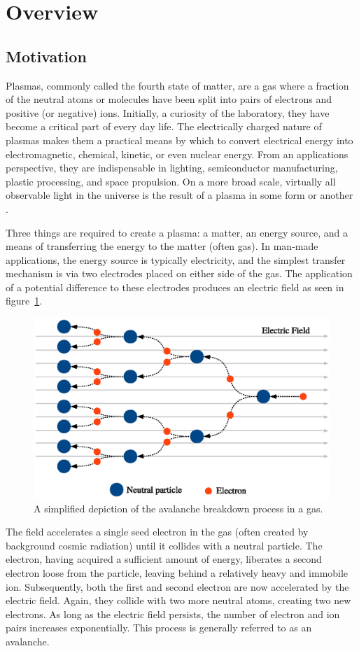 \section{Overview}

\subsection{Motivation}
Plasmas, commonly called the fourth state of matter, are a gas where a fraction
of the neutral atoms or molecules have been split into pairs of electrons and
positive (or negative) ions. Initially, a curiosity of the laboratory, they have
become a critical part of every day life. The electrically charged nature of
plasmas makes them a practical means by which to convert electrical energy into
electromagnetic, chemical, kinetic, or even nuclear energy. From an applications
perspective, they are indispensable in lighting, semiconductor manufacturing,
plastic processing, and space propulsion. On a more broad scale, virtually all
observable light in the universe is the result of a plasma in some form or
another \cite{NA2007}.

Three things are required to create a plasma: a matter, an energy source, and a
means of transferring the energy to the matter (often gas). In man-made
applications, the energy source is typically electricity, and the simplest
transfer mechanism is via two electrodes placed on either side of the gas. The
application of a potential difference to these electrodes produces an electric
field as seen in figure~\ref{fig:avalanche}.
\begin{figure}
  \centering
  \includegraphics{./chapters/introduction/figures/avalanche.eps}
  \caption{A simplified depiction of the avalanche breakdown process in a gas.}
  \label{fig:avalanche}
\end{figure}
The field accelerates a single seed electron in the gas (often created by
background cosmic radiation) until it collides with a neutral particle. The
electron, having acquired a sufficient amount of energy, liberates a second
electron loose from the particle, leaving behind a relatively heavy and immobile
ion. Subsequently, both the first and second electron are now accelerated by the
electric field. Again, they collide with two more neutral atoms, creating two
new electrons. As long as the electric field persists, the number of electron
and ion pairs increases exponentially. This process is generally referred to as
an avalanche.

